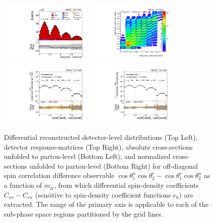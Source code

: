 \clearpage
\begin{figure}[htb]
\begin{center}
 \includegraphics[width=0.40\textwidth]{fig_fullRun2UL/controlplots/combined/Hyp_LLBarCMnr_vs_TTBarMass.pdf}
 \includegraphics[width=0.40\textwidth]{fig_fullRun2UL/unfolding/combined/ResponseMatrix_c_Mnr_mttbar.pdf} \\
 \includegraphics[width=0.40\textwidth]{fig_fullRun2UL/unfolding/combined/UnfoldedResults_c_Mnr_mttbar.pdf}
 \includegraphics[width=0.40\textwidth]{fig_fullRun2UL/unfolding/combined/UnfoldedResultsNorm_c_Mnr_mttbar.pdf} \\
\label{fig:c_Mnr_mttbar}
\caption{Differential reconstructed detector-level distributions (Top Left), detector response-matrices (Top Right), absolute cross-sections unfolded to parton-level (Bottom Left), and normalized cross-sections unfolded to parton-level (Bottom Right) for off-diagonal spin correlation difference observable $\cos\theta_{1}^{n}\cos\theta_{2}^{r}-\cos\theta_{1}^{r}\cos\theta_{2}^{n}$ as a function of $m_{t\bar{t}}$, from which differential spin-density coefficients $C_{nr}-C_{rn}$ (sensitive to spin-density coefficient functions $c_k$) are extracted.  The range of the primary axis is applicable to each of the sub-phase space regions partitioned by the grid lines.}
\end{center}
\end{figure}
